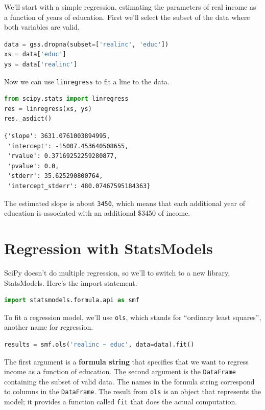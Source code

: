 We'll start with a simple regression, estimating the parameters of real
income as a function of years of education. First we'll select the
subset of the data where both variables are valid.

\begin{lstlisting}[language=Python,style=source]
data = gss.dropna(subset=['realinc', 'educ'])
xs = data['educ']
ys = data['realinc']
\end{lstlisting}

Now we can use \passthrough{\lstinline!linregress!} to fit a line to the
data.

\begin{lstlisting}[language=Python,style=source]
from scipy.stats import linregress
res = linregress(xs, ys)
res._asdict()
\end{lstlisting}

\begin{lstlisting}[style=output]
{'slope': 3631.0761003894995,
 'intercept': -15007.453640508655,
 'rvalue': 0.37169252259280877,
 'pvalue': 0.0,
 'stderr': 35.625290800764,
 'intercept_stderr': 480.07467595184363}
\end{lstlisting}

The estimated slope is about \passthrough{\lstinline!3450!}, which means
that each additional year of education is associated with an additional
\$3450 of income.

\hypertarget{regression-with-statsmodels}{%
\section{Regression with
StatsModels}\label{regression-with-statsmodels}}

SciPy doesn't do multiple regression, so we'll to switch to a new
library, StatsModels. Here's the import statement.

\begin{lstlisting}[language=Python,style=source]
import statsmodels.formula.api as smf
\end{lstlisting}

To fit a regression model, we'll use \passthrough{\lstinline!ols!},
which stands for ``ordinary least squares'', another name for
regression.

\begin{lstlisting}[language=Python,style=source]
results = smf.ols('realinc ~ educ', data=data).fit()
\end{lstlisting}

The first argument is a \textbf{formula string} that specifies that we
want to regress income as a function of education. The second argument
is the \passthrough{\lstinline!DataFrame!} containing the subset of
valid data. The names in the formula string correspond to columns in the
\passthrough{\lstinline!DataFrame!}. The result from
\passthrough{\lstinline!ols!} is an object that represents the model; it
provides a function called \passthrough{\lstinline!fit!} that does the
actual computation.

